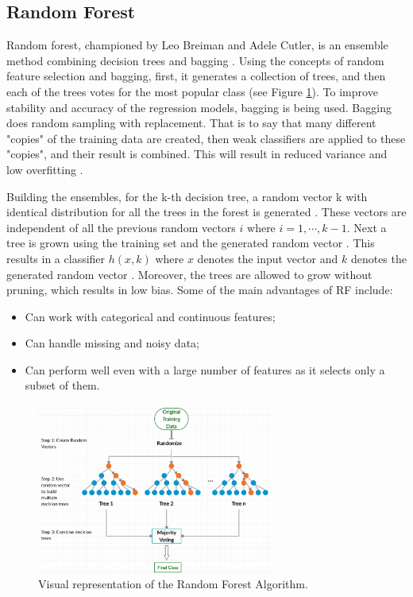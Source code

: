 \documentclass{usiinftr}
\begin{document}
\subsection{Random Forest}
Random forest, championed by Leo Breiman and Adele Cutler, is an ensemble method combining decision trees and bagging \cite{22}. Using the concepts of random feature selection and bagging, first, it generates a collection of trees, and then each of the trees votes for the most popular class \cite{4} (see Figure \ref{RF_fig}). To improve stability and accuracy of the regression models, bagging is being used. Bagging does random sampling with replacement. That is to say that  many different "copies" of the training data are created, then weak classifiers are applied to these "copies", and their result is combined. This will result in reduced variance and low overfitting \cite{23}. 


	Building the ensembles, for the k-th decision tree, a random vector k with identical distribution for all the trees in the forest is generated \cite{22}. These vectors are independent of all the previous random vectors $i$ where $i = 1,\cdots,k-1$. Next a tree is grown using the training set and the generated random vector \cite{22}. This results in a classifier $h(x,k)$ where $x$ denotes the input vector and $k$ denotes the generated random vector \cite{22}. Moreover, the trees are allowed to grow without pruning, which results in low bias.  Some of the main advantages of RF include\cite{4}:

\begin{itemize}
\item Can work with categorical and continuous features;
\item Can handle missing and noisy data;
\item Can perform well even with a large number of features as it selects only a subset of them. 
\end{itemize} 

\begin{figure}[h!] 
\centering
\includegraphics[width=0.7\textwidth]{images/image122.png}
\caption{Visual representation of the Random Forest Algorithm.}
\label{RF_fig}
\end{figure}
\end{document}
